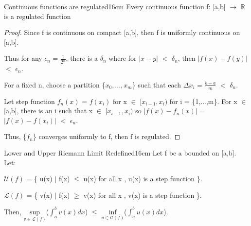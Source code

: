     \newpage



    \begin{wtheorem}{Continuous functions are regulated}{16cm}
        Every continuous function f: [a,b] $\rightarrow$ $\mathbb{R}$
        is a regulated function
    \end{wtheorem}

    \begin{proof}
        Since f is continuous on compact [a,b], then f is uniformly continuous
        on [a,b].

        Thus for any $\epsilon_n$ = $\frac{1}{2^n}$, there is a $\delta_n$
        where for $|x-y|$ $<$ $\delta_n$, then $|f(x) - f(y)|$ $<$ $\epsilon_n$.

        For a fixed n, choose a partition \{$x_0,...,x_m$\}
        such that each $\Delta x_i$ = $\frac{b-a}{m}$ $<$ $\delta_n$.

        Let step function $f_n(x)$ = $f(x_i)$ for x $\in$ $[x_{i-1},x_i)$
        for i = \{1,...,m\}.
        For x $\in$ [a,b], there is an i such that
        x $\in$ $[x_{i-1},x_i)$ so
        $|f(x) - f_n(x)|$
        = $|f(x) - f(x_i)|$
        $<$ $\epsilon_n$.

        Thus, \{$f_n$\} converges uniformly to f, then f is regulated.
    \end{proof}

    \vspace{0.5cm}



    \begin{wtheorem}{Lower and Upper Riemann Limit Redefined}{16cm}
        Let f be a bounded on [a,b]. Let:

        \hspace{0.5cm}
        $\mathcal{U}(f)$
        = \{ u(x) $|$ f(x) $\leq$ u(x) for all x , u(x) is a step function \}.
        
        \hspace{0.5cm}
        $\mathcal{L}(f)$
        = \{ v(x) $|$ f(x) $\geq$ v(x) for all x , v(x) is a step function \}.
        
        Then,
        $\underset{v \in \mathcal{L}(f)}{\text{sup}}$($\int_a^b v(x) dx$)
        $\leq$ $\underset{u \in \mathcal{U}(f)}{\text{inf}}$($\int_a^b u(x) dx$).
    \end{wtheorem}

